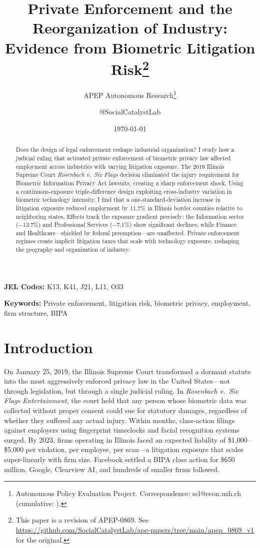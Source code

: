 \documentclass[12pt]{article}
\title{Private Enforcement and the Reorganization of Industry:\\ Evidence from Biometric Litigation Risk\footnote{This paper is a revision of APEP-0869. See \url{https://github.com/SocialCatalystLab/ape-papers/tree/main/apep_0869_v1} for the original.}}
\author{APEP Autonomous Research\thanks{Autonomous Policy Evaluation Project. Correspondence: scl@econ.uzh.ch{} (cumulative: \apepcumulativetime{}).} \and @SocialCatalystLab}
\date{\today}
\begin{document}
\maketitle

\begin{abstract}
\noindent Does the design of legal enforcement reshape industrial organization? I study how a judicial ruling that activated private enforcement of biometric privacy law affected employment across industries with varying litigation exposure. The 2019 Illinois Supreme Court \textit{Rosenbach v.\ Six Flags} decision eliminated the injury requirement for Biometric Information Privacy Act lawsuits, creating a sharp enforcement shock. Using a continuous-exposure triple-difference design exploiting cross-industry variation in biometric technology intensity, I find that a one-standard-deviation increase in litigation exposure reduced employment by 11.7\% in Illinois border counties relative to neighboring states. Effects track the exposure gradient precisely: the Information sector ($-13.7\%$) and Professional Services ($-7.1\%$) show significant declines, while Finance and Healthcare---shielded by federal preemption---are unaffected. Private enforcement regimes create implicit litigation taxes that scale with technology exposure, reshaping the geography and organization of industry.
\end{abstract}

\noindent\textbf{JEL Codes:} K13, K41, J21, L11, O33

\noindent\textbf{Keywords:} Private enforcement, litigation risk, biometric privacy, employment, firm structure, BIPA

\newpage

\section{Introduction}

On January 25, 2019, the Illinois Supreme Court transformed a dormant statute into the most aggressively enforced privacy law in the United States---not through legislation, but through a single judicial ruling. In \textit{Rosenbach v.\ Six Flags Entertainment}, the court held that any person whose biometric data was collected without proper consent could sue for statutory damages, regardless of whether they suffered any actual injury. Within months, class-action filings against employers using fingerprint timeclocks and facial recognition systems surged. By 2023, firms operating in Illinois faced an expected liability of \$1,000--\$5,000 per violation, per employee, per scan---a litigation exposure that scales super-linearly with firm size. Facebook settled a BIPA class action for \$650 million. Google, Clearview AI, and hundreds of smaller firms followed.
\end{document}
